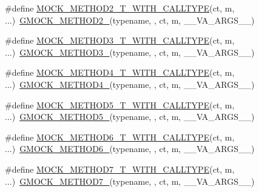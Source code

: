 \begin{DoxyCompactItemize}
\item 
\#define \hyperlink{gmock-generated-function-mockers_8h_a18e4e8da0bdf27bde5ffca30587ff074}{M\+O\+C\+K\+\_\+\+M\+E\+T\+H\+O\+D2\+\_\+\+T\+\_\+\+W\+I\+T\+H\+\_\+\+C\+A\+L\+L\+T\+Y\+PE}(ct,  m, ...)~\hyperlink{gmock-generated-function-mockers_8h_a885295ca6bebb15efb3fc786218c5d47}{G\+M\+O\+C\+K\+\_\+\+M\+E\+T\+H\+O\+D2\+\_\+}(typename, , ct, m, \+\_\+\+\_\+\+V\+A\+\_\+\+A\+R\+G\+S\+\_\+\+\_\+)
\item 
\#define \hyperlink{gmock-generated-function-mockers_8h_a1e723cc1c62c9fedb9f54ee30c111047}{M\+O\+C\+K\+\_\+\+M\+E\+T\+H\+O\+D3\+\_\+\+T\+\_\+\+W\+I\+T\+H\+\_\+\+C\+A\+L\+L\+T\+Y\+PE}(ct,  m, ...)~\hyperlink{gmock-generated-function-mockers_8h_af7c77ba511c631de02bb8c45a6ed3045}{G\+M\+O\+C\+K\+\_\+\+M\+E\+T\+H\+O\+D3\+\_\+}(typename, , ct, m, \+\_\+\+\_\+\+V\+A\+\_\+\+A\+R\+G\+S\+\_\+\+\_\+)
\item 
\#define \hyperlink{gmock-generated-function-mockers_8h_aae18ec395b1ba3e991a25ffb997821ee}{M\+O\+C\+K\+\_\+\+M\+E\+T\+H\+O\+D4\+\_\+\+T\+\_\+\+W\+I\+T\+H\+\_\+\+C\+A\+L\+L\+T\+Y\+PE}(ct,  m, ...)~\hyperlink{gmock-generated-function-mockers_8h_ab6430f2cfad9de4aca5258ea559294bb}{G\+M\+O\+C\+K\+\_\+\+M\+E\+T\+H\+O\+D4\+\_\+}(typename, , ct, m, \+\_\+\+\_\+\+V\+A\+\_\+\+A\+R\+G\+S\+\_\+\+\_\+)
\item 
\#define \hyperlink{gmock-generated-function-mockers_8h_a04f83b372ebe63dea92cb5c3502ff345}{M\+O\+C\+K\+\_\+\+M\+E\+T\+H\+O\+D5\+\_\+\+T\+\_\+\+W\+I\+T\+H\+\_\+\+C\+A\+L\+L\+T\+Y\+PE}(ct,  m, ...)~\hyperlink{gmock-generated-function-mockers_8h_a9e3ecd392499ab19a4a6d3adcabf56f6}{G\+M\+O\+C\+K\+\_\+\+M\+E\+T\+H\+O\+D5\+\_\+}(typename, , ct, m, \+\_\+\+\_\+\+V\+A\+\_\+\+A\+R\+G\+S\+\_\+\+\_\+)
\item 
\#define \hyperlink{gmock-generated-function-mockers_8h_a0dfe65f974c2b6d60cac3114489b4527}{M\+O\+C\+K\+\_\+\+M\+E\+T\+H\+O\+D6\+\_\+\+T\+\_\+\+W\+I\+T\+H\+\_\+\+C\+A\+L\+L\+T\+Y\+PE}(ct,  m, ...)~\hyperlink{gmock-generated-function-mockers_8h_ad0ca7f6973a076d0af4c953f8ed91842}{G\+M\+O\+C\+K\+\_\+\+M\+E\+T\+H\+O\+D6\+\_\+}(typename, , ct, m, \+\_\+\+\_\+\+V\+A\+\_\+\+A\+R\+G\+S\+\_\+\+\_\+)
\item 
\#define \hyperlink{gmock-generated-function-mockers_8h_ae820565d836fda34401e8bdcfaaa7605}{M\+O\+C\+K\+\_\+\+M\+E\+T\+H\+O\+D7\+\_\+\+T\+\_\+\+W\+I\+T\+H\+\_\+\+C\+A\+L\+L\+T\+Y\+PE}(ct,  m, ...)~\hyperlink{gmock-generated-function-mockers_8h_ab98a8399ba62b53b375c2807f4d39d2f}{G\+M\+O\+C\+K\+\_\+\+M\+E\+T\+H\+O\+D7\+\_\+}(typename, , ct, m, \+\_\+\+\_\+\+V\+A\+\_\+\+A\+R\+G\+S\+\_\+\+\_\+)

\end{DoxyCompactItemize}
